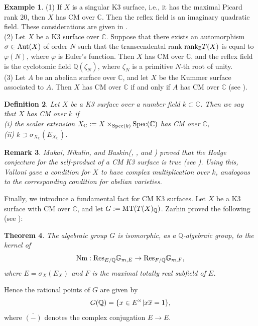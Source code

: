 \documentclass[reqno,a4paper,11pt]{amsart}
\newtheorem{dfn}{Definition}[section]
\newtheorem{thm}[dfn]{Theorem}
\newtheorem{rmk}[dfn]{Remark}
\theoremstyle{definition}
\theoremstyle{definition}
\newtheorem{exmp}[dfn]{Example}
\begin{document}
  \begin{exmp}\label{k3ex}
      (1) If $X$ is a singular K3 surface, i.e., it has  the maximal Picard rank $20$, then $X$ has CM over $\mathbb{C}$. Then the reflex field is an imaginary quadratic field. These considerations are given in \cite[Chapter 3, Remark 3.10]{Huy}. 
      \\\indent (2)  Let $X$ be a K3 surface over $\mathbb{C}$. Suppose that there exists an automorphism $\sigma\in {\rm Aut}(X)$ of order $N$ such that the transcendental rank ${\rm rank}_{\mathbb{Z}} T(X)$ is equal to  $\varphi(N)$,  where $\varphi$ is Euler's function. Then $X$ has CM over $\mathbb{C}$, and the reflex field is the cyclotomic field $\mathbb{Q}(\zeta_{N})$, where $\zeta_{N}$ is a primitive $N$-th root of unity.
      \\\indent (3) Let $A$ be an abelian surface over $\mathbb{C}$, and let $X$ be the Kummer surface associated to $A$. Then  $X$ has CM over $\mathbb{C}$ if and only if $A$ has CM over $\mathbb{C}$ (see \cite[Lemma 9.3]{Ito}).  
      \end{exmp}
\begin{dfn}\label{def field}
    Let $X$ be a K3 surface over a number field $k\subset \mathbb{C}$. Then we say that $X$ has CM over $k$ if 
    \\\indent (i) the scalar extension $X_{\mathbb{C}} := X\times_{{\rm Spec}(k)}{\rm Spec}(\mathbb{C})$ has CM over $\mathbb{C}$,
    \\\indent (ii) $k\supset \sigma_{X_{\mathbb{C}}}(E_{X_{\mathbb{C}}})$.
\end{dfn} 
\begin{rmk}Mukai, Nikulin,  and Buskin(\cite{mukai}, \cite{nik}, and \cite{bus}) proved that the Hodge conjecture for the self-product of a CM K3 surface is true (see  \cite[Corollary of Theorem 1.1]{bus}). Using this, Valloni \cite{val21} gave a condition for $X$ to have complex multiplication over $k$, analogous to the corresponding condition for abelian varieties.
\end{rmk}
Finally, we introduce a fundamental fact for CM K3 surfaces. Let $X$ be a K3 surface with CM over $\mathbb{C}$, and  let $G:={\rm MT}(T(X)_{\mathbb{Q}})$. Zarhin  proved the following  (see  \cite[Theorem 2.3.1]{Zarhin}): 
    \begin{thm}
       The algebraic group $G$ is isomorphic,  as a $\mathbb{Q}$-algebraic group, to the kernel of
        \begin{align}
            {\rm Nm} : {\rm Res}_{E/\mathbb{Q}}\mathbb{G}_{m, E}\to {\rm Res}_{F/\mathbb{Q}}\mathbb{G}_{m, F},\notag
        \end{align}
    where $E=\sigma_{X}(E_{X})$ and $F$ is the maximal totally real subfield of $E$.
    \end{thm}
    Hence the rational points of $G$ are given by 
    \begin{align}
        G(\mathbb{Q})=\{ x\in E^{\times} | x\overline{x}=1\},\notag
    \end{align}
    where $\overline{(-)}$ denotes the complex conjugation $E\to E$.
\end{document}
